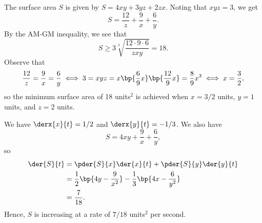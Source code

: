 \begin{solution}
    \begin{ppart}
        The surface area $S$ is given by $S = 4xy + 3yz + 2zx$. Noting that $xyz = 3$, we get \[S = \frac{12}{z} + \frac{9}x + \frac{6}{y}.\] By the AM-GM inequality, we see that \[S \geq 3 \sqrt[3]{\frac{12 \cdot 9 \cdot 6}{zxy}} = 18.\] Observe that \[\frac{12}{z} = \frac{9}{x} = \frac{6}{y} \iff 3 = xyz = x\bp{\frac{6}{9}x}\bp{\frac{12}{9} x} = \frac89 x^3 \iff x = \frac32,\] so the minimum surface area of 18 units$^2$ is achieved when $x = 3/2$ units, $y = 1$ units, and $z = 2$ units.
    \end{ppart}
    \begin{ppart}
        We have $\derx{x}{t} = 1/2$ and $\derx{y}{t} = -1/3$. We also have \[S = 4xy + \frac9x + \frac6y,\] so
        \begin{align*}
            \der{S}{t} &= \pder{S}{x} \der{x}{t} + \pder{S}{y} \der{y}{t}\\
            &= \frac12\bp{4y - \frac9{x^2}} - \frac13 \bp{4x - \frac6{y^2}}\\
            &= \frac7{18}.
        \end{align*}
        Hence, $S$ is increasing at a rate of $7/18$ units$^2$ per second.
    \end{ppart}
\end{solution}

